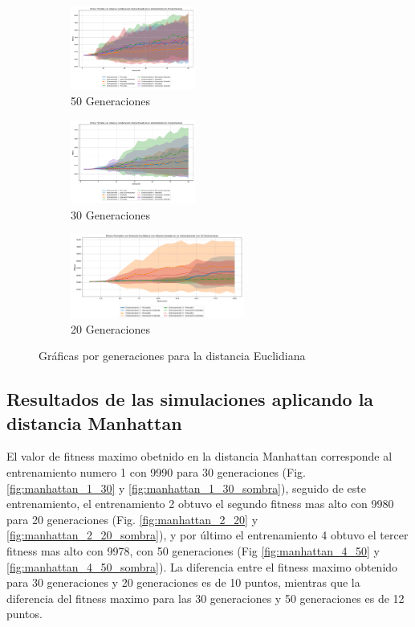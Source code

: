 \documentclass[lettersize, journal]{IEEEtran}
\begin{document}
\begin{figure}[ht]
    \centering
    \begin{subfigure}{0.3\textwidth}
        \centering
        \includegraphics[width=\textwidth, height=2.74cm]{Euclidiana/Fitness_Acumulado_Eucli_50Gen.png}
        \caption{50 Generaciones}
        \label{fig:eucli_50gen}
    \end{subfigure}
    \hfill
    \begin{subfigure}{0.3\textwidth}
        \centering
        \includegraphics[width=\textwidth, height=2.74cm]{Euclidiana/Fitness_Acumulado_Eucli_30Gen.png}
        \caption{30 Generaciones}
        \label{fig:eucli_30gen}
    \end{subfigure}
    \hfill
    \begin{subfigure}{0.3\textwidth}
        \centering
        \includegraphics[width=\textwidth, height=2.74cm]{Euclidiana/Fitness_Acumulado_Eucli_20Gen.png}
        \caption{20 Generaciones}
        \label{fig:eucli_20gen}
    \end{subfigure}
	\caption{Gráficas por generaciones para la distancia Euclidiana}
    \label{fig:graficas_generales_euclidiana}
\end{figure}

\subsection{Resultados de las simulaciones aplicando la distancia Manhattan}
El valor de fitness maximo obetnido en la distancia Manhattan corresponde al entrenamiento numero 1 con 9990 para 30 generaciones  (Fig. \ref{fig:manhattan_1_30} y \ref{fig:manhattan_1_30_sombra}), seguido de este entrenamiento, el entrenamiento 2 obtuvo el segundo fitness mas alto con 9980 para 20 generaciones (Fig. \ref{fig:manhattan_2_20} y \ref{fig:manhattan_2_20_sombra}), y por último el entrenamiento 4 obtuvo el tercer fitness mas alto con 9978, con 50 generaciones  (Fig \ref{fig:manhattan_4_50} y \ref{fig:manhattan_4_50_sombra}). 
La diferencia entre el fitness maximo obtenido para 30 generaciones y 20 generaciones es de 10 puntos, mientras que la diferencia del fitness maximo para las 30 generaciones y 50 generaciones es de 12 puntos.
\end{document}
